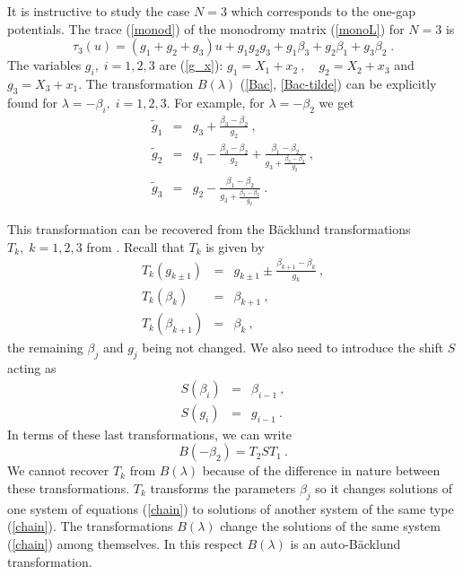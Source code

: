 \documentclass[a4paper,11pt]{article}
\begin{document}
It is instructive to study the case $N=3$ which corresponds to the one-gap
potentials. The trace (\ref{monod}) of the monodromy matrix (\ref{monoL})
for $N=3$ is
\begin{equation}
\label{tau_3}
\tau_3(u)=(g_1+g_2+g_3)u + g_1 g_2 g_3 + g_1 \beta_3 + g_2 \beta_1 + g_3 \beta_2\;.
\end{equation}
The variables $g_i,\;i=1,2,3$ are (\ref{g_x}):
$g_1=X_1+x_2~,\quad g_2=X_2+x_3$ and $g_3=X_3+x_1$.
The transformation $B(\lambda )$ (\ref{Bac}, \ref{Bac-tilde}) can be explicitly found for $\lambda =-\beta_i,\;i=1,2,3$. For example, for $\lambda =-\beta_2$ we get
\begin{eqnarray}
\label{sol}
{\tilde g}_1 \!\!\!&=&\!\!\! g_3+\frac{\beta_3-\beta_2}{g_2}  ~,\\
{\tilde g}_2 \!\!\!&=&\!\!\! g_1-\frac{\beta_3-\beta_2}{g_2}
       +\frac{\beta_1-\beta_2}{g_3+\frac{\beta_3-\beta_2}{g_2}} ~,\\
{\tilde g}_3 \!\!\!&=&\!\!\! g_2-\frac{\beta_1-\beta_2}{g_3+\frac{\beta_3-\beta_2}{g_2}} ~.
\end{eqnarray}

This transformation can be recovered from the B\"acklund transformations
$T_k,\;k=1,2,3$ from \cite{Veselov,Adler}. Recall that $T_k$ is given by
\begin{eqnarray}
\label{Ba_ves}
T_k(g_{k\pm 1}) \!\!\!&=&\!\!\! g_{k\pm 1}\pm \frac{\beta_{k+1}-\beta_k}{g_k} ~,\\
T_k(\beta _k) \!\!\!&=&\!\!\! \beta_{k+1} ~,\\
T_k(\beta_{k+1}) \!\!\!&=&\!\!\! \beta_k ~,
\end{eqnarray}
the remaining $\beta _j$ and $g_j$ being not changed. We also need to
introduce the shift $S$ acting as
\begin{eqnarray}
\label{S}
S(\beta_i) \!\!\!&=&\!\!\! \beta_{i-1} ~,\\
S(g_i) \!\!\!&=&\!\!\! g_{i-1}~.
\end{eqnarray}
In terms of these last transformations, we can write
\begin{equation}
\label{T}
B(-\beta_2)=T_2 S T_1 ~.
\end{equation}
We cannot recover $T_k$ from $B(\lambda )$ because of the difference in
nature between these transformations. $T_k$ transforms the parameters
$\beta_j$ so it changes solutions of one system of equations (\ref{chain})
to solutions of another system of the same type (\ref{chain}). The
transformations $B(\lambda)$ change the solutions of the same system
(\ref{chain}) among themselves. In this respect $B(\lambda )$ is an
auto-B\"acklund transformation.
\end{document}
